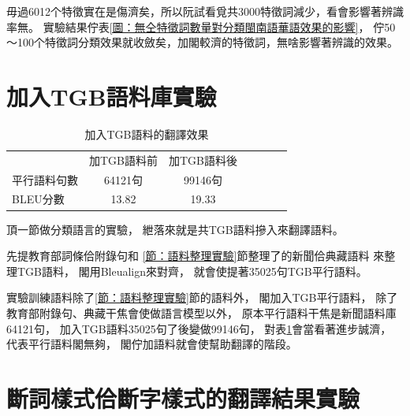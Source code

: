 毋過6012个特徵實在是傷濟矣，所以阮試看覓共3000特徵詞減少，看會影響著辨識率無。
實驗結果佇表\ref{圖：無仝特徵詞數量對分類閩南語華語效果的影響}，
佇50～100个特徵詞分類效果就收斂矣，加閣較濟的特徵詞，無啥影響著辨識的效果。

\section{加入TGB語料庫實驗}
\label{節：加入TGB語料庫實驗}

\begin{table}
\caption{加入TGB語料的翻譯效果}
\label{表：加入TGB語料的翻譯效果}
\centering
\begin{tabular}{lcccccc}
& 加TGB語料前 & 加TGB語料後\\
平行語料句數 & 64121句 & 99146句\\
BLEU分數 & 13.82 & 19.33\\
\end{tabular}
\end{table}

頂一節做分類語言的實驗，
紲落來就是共TGB語料摻入來翻譯語料。

先提教育部詞條佮附錄句和
\ref{節：語料整理實驗}節整理了的新聞佮典藏語料
來整理TGB語料，
閣用Bleualign來對齊，
就會使提著35025句TGB平行語料。

實驗訓練語料除了\ref{節：語料整理實驗}節的語料外，
閣加入TGB平行語料，
除了教育部附錄句、典藏干焦會使做語言模型以外，
原本平行語料干焦是新聞語料庫64121句，
加入TGB語料35025句了後變做99146句，
對表\ref{表：加入TGB語料的翻譯效果}會當看著進步誠濟，
代表平行語料閣無夠，
閣佇加語料就會使幫助翻譯的階段。

\section{斷詞樣式佮斷字樣式的翻譯結果實驗}
\label{節：斷詞樣式佮斷字樣式的翻譯結果實驗}


